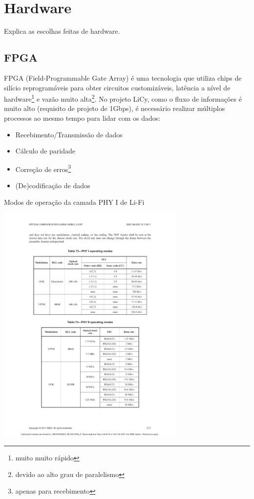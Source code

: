 	\section{Hardware}\label{sec-hardware}
	
	Explica as escolhas feitas de hardware.
	
	\subsection{FPGA}\label{hard-fpga}
	
	FPGA (Field-Programmable Gate Array) é uma tecnologia que utiliza chips de silício reprogramáveis para obter circuitos customizáveis, latência a nível de hardware\footnote{muito muito rápido} e vazão muito alta\footnote{devido ao alto grau de paralelismo}. No projeto LiCy, como o fluxo de informações é muito alto (requisito de projeto de 1Gbps), é necessário realizar múltiplos processos ao mesmo tempo para lidar com os dados:
	
	\begin{itemize}  
		\item Recebimento/Transmissão de dados
		\item Cálculo de paridade
		\item Correção de erros\footnote{apenas para recebimento}
		\item (De)codificação de dados
	\end{itemize}
	
	\begin{table}[htbp]
		\caption{\label{tab_phy1} Modos de operação da camada PHY I de Li-Fi}

		\centering
		\includegraphics[clip, trim=37mm 151mm 36mm 51mm,  width=0.7\textwidth]{pag213.pdf}
	\end{table}
	
